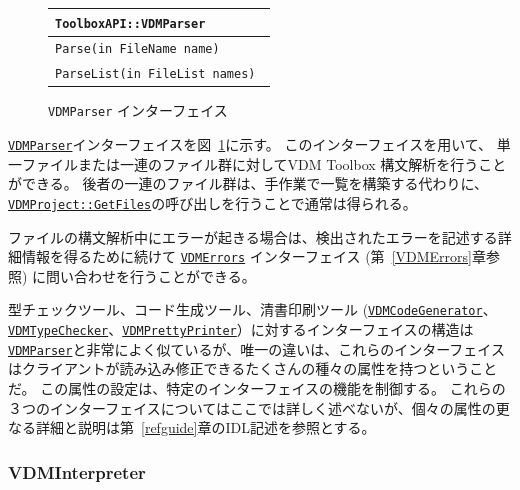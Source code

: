\documentclass[\pformat,12pt]{jarticle}
\newcommand{\VDMCodeGenerator}{\hyperlink{interface.VDMCodeGenerator}{VDMCodeGenerator}}
\newcommand{\VDMErrors}{\hyperlink{interface.VDMErrors}{VDMErrors}}
\newcommand{\VDMParser}{\hyperlink{interface.VDMParser}{VDMParser}}
\newcommand{\VDMPrettyPrinter}{\hyperlink{interface.VDMPrettyPrinter}{VDMPrettyPrinter}}
\newcommand{\VDMTypeChecker}{\hyperlink{interface.VDMTypeChecker}{VDMTypeChecker}}
\begin{document}
\begin{figure}[tbh]
\begin{center}
\begin{tabular}{|l|}
\hline
{\tt ToolboxAPI::VDMParser } \\
\hline
{\tt Parse(in FileName name) } \\
{\tt ParseList(in FileList names) } \\
\hline
\end{tabular}
\caption{{\tt VDMParser} インターフェイス}\label{fig:VDMParser}
\end{center}
\end{figure}

{\tt \VDMParser}インターフェイスを図~\ref{fig:VDMParser}に示す。
このインターフェイスを用いて、 単一ファイルまたは一連のファイル群に対してVDM Toolbox 構文解析を行うことができる。
後者の一連のファイル群は、手作業で一覧を構築する代わりに、\texttt{\hyperlink{method.VDMProject::GetFiles}{VDMProject::GetFiles}}の呼び出しを行うことで通常は得られる。

ファイルの構文解析中にエラーが起きる場合は、検出されたエラーを記述する詳細情報を得るために続けて {\tt  \VDMErrors} インターフェイス (第~\ref{VDMErrors}章参照) に問い合わせを行うことができる。

型チェックツール、コード生成ツール、清書印刷ツール ({\tt \VDMCodeGenerator}、{\tt \VDMTypeChecker}、{\tt \VDMPrettyPrinter}）に対するインターフェイスの構造は{\tt \VDMParser}と非常によく似ているが、唯一の違いは、これらのインターフェイスはクライアントが読み込み修正できるたくさんの種々の属性を持つということだ。
この属性の設定は、特定のインターフェイスの機能を制御する。
これらの３つのインターフェイスについてはここでは詳しく述べないが、個々の属性の更なる詳細と説明は第~\ref{refguide}章のIDL記述を参照とする。

\subsubsection{VDMInterpreter}

\end{document}

